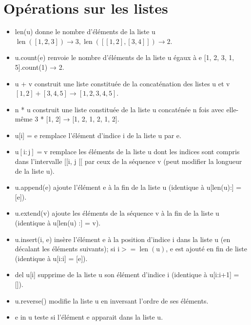 \documentclass[10pt]{article}
\begin{document}
\section{Opérations sur les listes}
\begin{itemize}
  \item[-] len(u) donne le nombre d'éléments de la liste u $\operatorname{len}([1,2,3]) \rightarrow 3, \operatorname{len}([[1,2],[3,4]]) \rightarrow 2$.
  \item[-] u.count(e) renvoie le nombre d'éléments de la liste u égaux à e [1, 2, 3, 1, 5].count(1) → 2.
  \item[-] u + v construit une liste constituée de la concaténation des listes u et v $[1,2]+[3,4,5] \rightarrow[1,2,3,4,5]$.
  \item[-] n * u construit une liste constituée de la liste u concaténée n fois avec elle-même 3 * [1, 2] → [1, 2, 1, 2, 1, 2].
  \item[-] u[i] = e remplace l'élément d'indice i de la liste u par e.
  \item[-] $\mathrm{u}[\mathrm{i}: \mathrm{j}]=\mathrm{v}$ remplace les éléments de la liste u dont les indices sont compris dans l'intervalle [[i, j [[ par ceux de la séquence v (peut modifier la longueur de la liste u).
  \item[-] u.append(e) ajoute l'élément e à la fin de la liste u (identique à u[len(u):] = [e]).
  \item[-] u.extend(v) ajoute les éléments de la séquence v à la fin de la liste u (identique à u[len(u) :] = v).
  \item[-] u.insert(i, e) insère l'élément e à la position d'indice i dans la liste u (en décalant les éléments suivants); si $\mathrm{i}>=\operatorname{len}(\mathrm{u})$, e est ajouté en fin de liste (identique à u[i:i] = [e]).
  \item[-] del u[i] supprime de la liste u son élément d'indice i (identique à u[i:i+1] = []).
  \item[-] u.reverse() modifie la liste u en inversant l'ordre de ses éléments.
  \item[-] e in u teste si l'élément e apparait dans la liste u.
\end{itemize}
\end{document}
